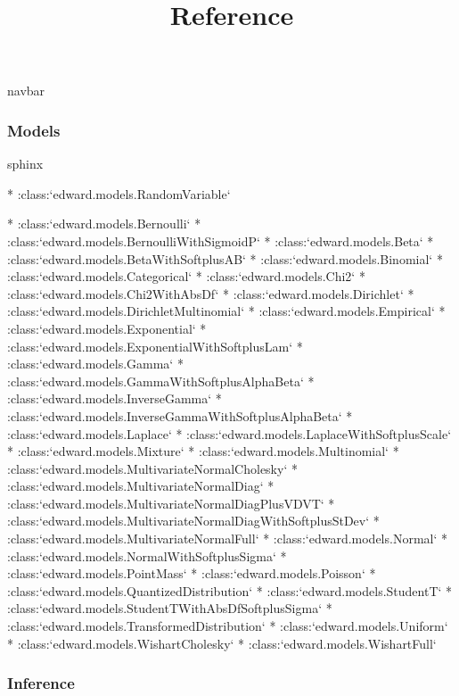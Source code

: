\title{Reference}

{{navbar}}

\subsubsection{Models}

{{sphinx

* :class:`edward.models.RandomVariable`
  
  * :class:`edward.models.Bernoulli`
  * :class:`edward.models.BernoulliWithSigmoidP`
  * :class:`edward.models.Beta`
  * :class:`edward.models.BetaWithSoftplusAB`
  * :class:`edward.models.Binomial`
  * :class:`edward.models.Categorical`
  * :class:`edward.models.Chi2`
  * :class:`edward.models.Chi2WithAbsDf`
  * :class:`edward.models.Dirichlet`
  * :class:`edward.models.DirichletMultinomial`
  * :class:`edward.models.Empirical`
  * :class:`edward.models.Exponential`
  * :class:`edward.models.ExponentialWithSoftplusLam`
  * :class:`edward.models.Gamma`
  * :class:`edward.models.GammaWithSoftplusAlphaBeta`
  * :class:`edward.models.InverseGamma`
  * :class:`edward.models.InverseGammaWithSoftplusAlphaBeta`
  * :class:`edward.models.Laplace`
  * :class:`edward.models.LaplaceWithSoftplusScale`
  * :class:`edward.models.Mixture`
  * :class:`edward.models.Multinomial`
  * :class:`edward.models.MultivariateNormalCholesky`
  * :class:`edward.models.MultivariateNormalDiag`
  * :class:`edward.models.MultivariateNormalDiagPlusVDVT`
  * :class:`edward.models.MultivariateNormalDiagWithSoftplusStDev`
  * :class:`edward.models.MultivariateNormalFull`
  * :class:`edward.models.Normal`
  * :class:`edward.models.NormalWithSoftplusSigma`
  * :class:`edward.models.PointMass`
  * :class:`edward.models.Poisson`
  * :class:`edward.models.QuantizedDistribution`
  * :class:`edward.models.StudentT`
  * :class:`edward.models.StudentTWithAbsDfSoftplusSigma`
  * :class:`edward.models.TransformedDistribution`
  * :class:`edward.models.Uniform`
  * :class:`edward.models.WishartCholesky`
  * :class:`edward.models.WishartFull`

}}

\subsubsection{Inference}


